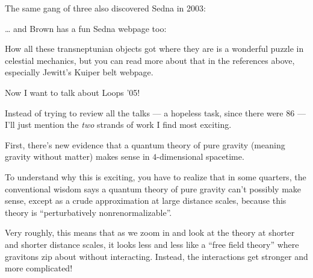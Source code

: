 \documentclass{article}
\def\tightlist{}
\renewcommand{\texttt}[1]{%
  \begingroup
  \ttfamily
  \begingroup\lccode`~=`/\lowercase{\endgroup\def~}{/\discretionary{}{}{}}%
  \begingroup\lccode`~=`[\lowercase{\endgroup\def~}{[\discretionary{}{}{}}%
  \begingroup\lccode`~=`.\lowercase{\endgroup\def~}{.\discretionary{}{}{}}%
  \catcode`/=\active\catcode`[=\active\catcode`.=\active
  \scantokens{#1\noexpand}%
  \endgroup
}
\begin{document}

The same gang of three also discovered Sedna in 2003:


\ldots{} and Brown has a fun Sedna webpage too:


How all these transneptunian objects got where they are is a wonderful
puzzle in celestial mechanics, but you can read more about that in the
references above, especially Jewitt's Kuiper belt webpage.

Now I want to talk about Loops '05!

Instead of trying to review all the talks --- a hopeless task, since
there were 86 --- I'll just mention the \emph{two} strands of work I
find most exciting.

First, there's new evidence that a quantum theory of pure gravity
(meaning gravity without matter) makes sense in \(4\)-dimensional
spacetime.

To understand why this is exciting, you have to realize that in some
quarters, the conventional wisdom says a quantum theory of pure gravity
can't possibly make sense, except as a crude approximation at large
distance scales, because this theory is ``perturbatively
nonrenormalizable''.

Very roughly, this means that as we zoom in and look at the theory at
shorter and shorter distance scales, it looks less and less like a
``free field theory'' where gravitons zip about without interacting.
Instead, the interactions get stronger and more complicated!
\end{document}
